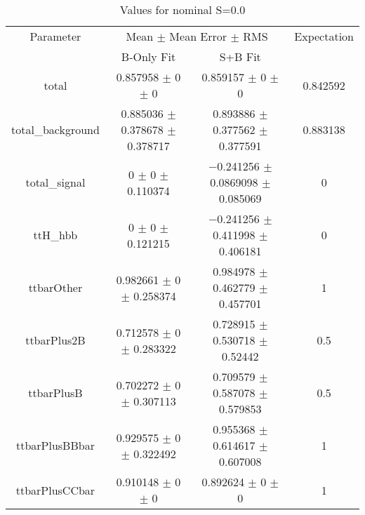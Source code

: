 \begin{table}
\centering
\caption{Values for nominal S=0.0}
\begin{tabular}{cccc}
\toprule
Parameter & \multicolumn{2}{c}{Mean $\pm$ Mean Error $\pm$ RMS} & Expectation\\
 & B-Only Fit & S+B Fit & \\
\midrule
total & \num{0.857958} $\pm$ \num{0} $\pm$ \num{0} & \num{0.859157} $\pm$ \num{0} $\pm$ \num{0} & \num{0.842592}\\
total\_background & \num{0.885036} $\pm$ \num{0.378678} $\pm$ \num{0.378717} & \num{0.893886} $\pm$ \num{0.377562} $\pm$ \num{0.377591} & \num{0.883138}\\
total\_signal & \num{0} $\pm$ \num{0} $\pm$ \num{0.110374} & \num{-0.241256} $\pm$ \num{0.0869098} $\pm$ \num{0.085069} & \num{0}\\
ttH\_hbb & \num{0} $\pm$ \num{0} $\pm$ \num{0.121215} & \num{-0.241256} $\pm$ \num{0.411998} $\pm$ \num{0.406181} & \num{0}\\
ttbarOther & \num{0.982661} $\pm$ \num{0} $\pm$ \num{0.258374} & \num{0.984978} $\pm$ \num{0.462779} $\pm$ \num{0.457701} & \num{1}\\
ttbarPlus2B & \num{0.712578} $\pm$ \num{0} $\pm$ \num{0.283322} & \num{0.728915} $\pm$ \num{0.530718} $\pm$ \num{0.52442} & \num{0.5}\\
ttbarPlusB & \num{0.702272} $\pm$ \num{0} $\pm$ \num{0.307113} & \num{0.709579} $\pm$ \num{0.587078} $\pm$ \num{0.579853} & \num{0.5}\\
ttbarPlusBBbar & \num{0.929575} $\pm$ \num{0} $\pm$ \num{0.322492} & \num{0.955368} $\pm$ \num{0.614617} $\pm$ \num{0.607008} & \num{1}\\
ttbarPlusCCbar & \num{0.910148} $\pm$ \num{0} $\pm$ \num{0} & \num{0.892624} $\pm$ \num{0} $\pm$ \num{0} & \num{1}\\
\bottomrule
\end{tabular}
\end{table}